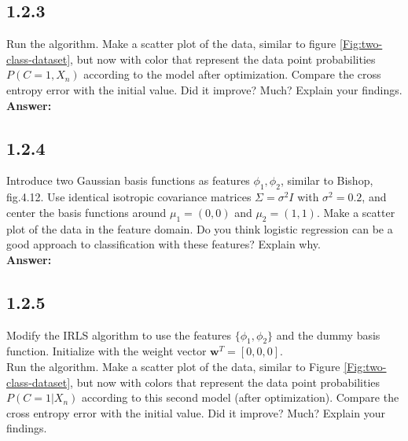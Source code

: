 \documentclass[a4paper]{article}
\begin{document}
\subsection*{1.2.3}

Run the algorithm. Make a scatter plot of the data, similar to figure \ref{Fig:two-class-dataset}, but now with color that represent the data point probabilities $P(C = 1, X_n)$ according to the model after optimization. Compare the cross entropy error with the initial value. Did it improve? Much? Explain your findings.\\

\textbf{Answer:}\\







\subsection*{1.2.4}

Introduce two Gaussian basis functions as features $\phi_1, \phi_2$, similar to Bishop, fig.4.12. Use identical isotropic covariance matrices $\Sigma = \sigma^2 I$ with $\sigma^2 = 0.2$, and center the basis functions around $\mu_1 = (0,0)$ and $\mu_2 = (1,1)$. Make a scatter plot of the data in the feature domain. Do you think logistic regression can be a good approach to classification with these features? Explain why.\\

\textbf{Answer:}\\










\subsection*{1.2.5}

Modify the IRLS algorithm to use the features $\{ \phi_1, \phi_2 \}$ and the dummy basis function. Initialize with the weight vector $\textbf{w}^T = [0,0,0]$.\\
Run the algorithm. Make a scatter plot of the data, similar to Figure \ref{Fig:two-class-dataset}, but now with colors that represent the data point probabilities $P(C = 1 | X_n)$ according to this second model (after optimization). Compare the cross entropy error with the initial value. Did it improve? Much? Explain your findings.\\
\end{document}
